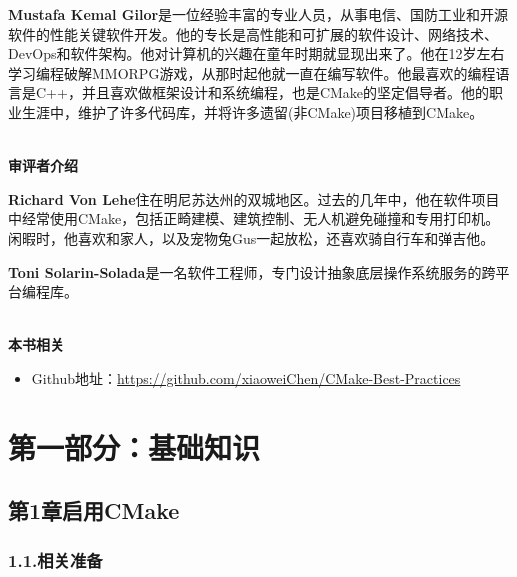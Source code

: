 \documentclass[11pt,a4paper,UTF8]{book}
\begin{document}
\begin{sloppypar}
	\textbf{Mustafa Kemal Gilor}是一位经验丰富的专业人员，从事电信、国防工业和开源软件的性能关键软件开发。他的专长是高性能和可扩展的软件设计、网络技术、DevOps和软件架构。他对计算机的兴趣在童年时期就显现出来了。他在12岁左右学习编程破解MMORPG游戏，从那时起他就一直在编写软件。他最喜欢的编程语言是C++，并且喜欢做框架设计和系统编程，也是CMake的坚定倡导者。他的职业生涯中，维护了许多代码库，并将许多遗留(非CMake)项目移植到CMake。
	
	\hspace*{\fill} \\ %
	\noindent\textbf{审评者介绍}
	
	\textbf{Richard Von Lehe}住在明尼苏达州的双城地区。过去的几年中，他在软件项目中经常使用CMake，包括正畸建模、建筑控制、无人机避免碰撞和专用打印机。闲暇时，他喜欢和家人，以及宠物兔Gus一起放松，还喜欢骑自行车和弹吉他。
	
	\textbf{Toni Solarin-Solada}是一名软件工程师，专门设计抽象底层操作系统服务的跨平台编程库。
	
	
	\hspace*{\fill} \\ %
	\noindent\textbf{本书相关}
	\begin{itemize}
	\item Github地址：\url{https://github.com/xiaoweiChen/CMake-Best-Practices}
	\end{itemize}
	\newpage
	
	\pagestyle{empty}
	
	\newpage
	
	\tableofcontents
	\newpage

	
	\color{white}
	\section*{第一部分：基础知识}
	\pagecolor{mygray}
	\textbf{}
	\newpage
	\color{black}
	\pagecolor{white}

	\subsection*{ 第1章\hspace{0.5cm}启用CMake}
	
	
	\subsubsection*{ 1.1.\hspace{0.2cm}相关准备}
	
	

\end{sloppypar}
\end{document}
